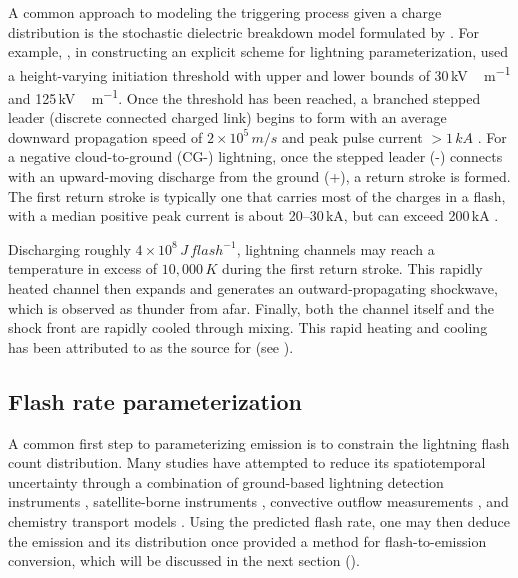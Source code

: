 	A common approach to modeling the triggering process given a charge distribution is the stochastic dielectric breakdown model formulated by \citet{Niemeyer:1984rr,Wiesmann:1986wd}. For example, \citet{Mansell:2002kx}, in constructing an explicit scheme for lightning parameterization, used a height-varying initiation threshold with upper and lower bounds of 30\,\unit{kV\,m^{-1}} and 125\,\unit{kV\,m^{-1}}. Once the threshold has been reached, a branched stepped leader (discrete connected charged link) begins to form with an average downward propagation speed of $2\times10^5\,\unit{m/s}$ and peak pulse current $>1\,\unit{kA}$ \citep{Uman:1989aa}. For a negative cloud-to-ground (CG-) lightning, once the stepped leader (-) connects with an upward-moving discharge from the ground (+), a return stroke is formed. The first return stroke is typically one that carries most of the charges in a flash, with a median positive peak current is about 20--30\,\unit{kA},  but can exceed 200\,\unit{kA} \citep{Orville:2010uq,Cummins:2009aa}.
	
	Discharging roughly $4\times10^8\,\unit{J\,flash^{-1}}$, lightning channels may reach a temperature in excess of $10,000\,\unit{K}$ during the first return stroke. This rapidly heated channel then expands and generates an outward-propagating shockwave, which is observed as thunder from afar. Finally, both the channel itself and the shock front are rapidly cooled through mixing. This rapid heating and cooling has been attributed to as the source for {\lnox} (see ).
	
\subsection{Flash rate parameterization}\label{ssec:intro/lightning/flash}

	A common first step to parameterizing {\lnox} emission is to constrain the lightning flash count distribution. Many studies have attempted to reduce its spatiotemporal uncertainty through a combination of ground-based lightning detection instruments \citep[e.g.][]{Boccippio:2001ys,Hansen:2010fk}, satellite-borne instruments \citep[e.g.][]{Ushio:2001kx,Jourdain:2010tw,Martini:2011fk}, convective outflow measurements \citep[e.g.][]{Pickering:1998sh,Skamarock:2003mq}, and chemistry transport models \citep[e.g.][]{Price:1997fk,Allen:2010fk,Allen:2012fk,Ott:2010lo}. Using the predicted flash rate, one may then deduce the {\lnox} emission and its distribution once provided a method for flash-to-emission conversion, which will be discussed in the next section ().

